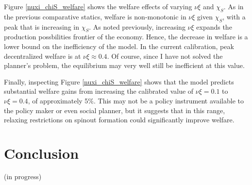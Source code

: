 \documentclass[11pt,english]{article}
\theoremstyle{remark}
\begin{document}
Figure \ref{nuxi_chiS_welfare} shows the welfare effects of varying $\nu \xi$ and $\chi_S$. As in the previous comparative statics, welfare is non-monotonic in $\nu \xi$ given $\chi_S$, with a peak that is increasing in $\chi_S$. As noted previously, increasing $\nu \xi$ expands the production possbilities frontier of the economy. Hence, the decrease in welfare is a lower bound on the inefficiency of the model. In the current calibration, peak decentralized welfare is at $\nu \xi \approx 0.4$. Of course, since I have not solved the planner's problem, the equilibrium may very well still be inefficient at this value. 

Finally, inspecting Figure \ref{nuxi_chiS_welfare} shows that the model predicts substantial welfare gains from increasing the calibrated value of $\nu \xi = 0.1$ to $\nu \xi = 0.4$, of approximately 5\%. This may not be a policy instrument available to the policy maker or even social planner, but it suggests that in this range, relaxing restrictions on spinout formation could significantly improve welfare. 



\section{Conclusion}\label{conclusion}

(in progress)


\end{document}
